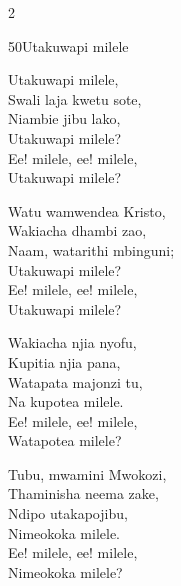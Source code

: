 \begin{multicols}{2}
\begin{hymn}{50}{Utakuwapi milele}{}
\begin{stanza}
Utakuwapi milele,\\
Swali laja kwetu sote,\\
Niambie jibu lako,\\
Utakuwapi milele?\\
Ee! milele, ee! milele,\\
Utakuwapi milele?
\end{stanza}
\begin{stanza}
Watu wamwendea Kristo,\\
Wakiacha dhambi zao,\\
Naam, watarithi mbinguni;\\
Utakuwapi milele?\\
Ee! milele, ee! milele,\\
Utakuwapi milele?
\end{stanza}
\begin{stanza}
Wakiacha njia nyofu,\\
Kupitia njia pana,\\
Watapata majonzi tu,\\
Na kupotea milele.\\
Ee! milele, ee! milele,\\
Watapotea milele?
\end{stanza}
\begin{stanza}
Tubu, mwamini Mwokozi,\\
Thaminisha neema zake,\\
Ndipo utakapojibu,\\
Nimeokoka milele.\\
Ee! milele, ee! milele,\\
Nimeokoka milele?
\end{stanza}
\end{hymn}


\end{multicols}
